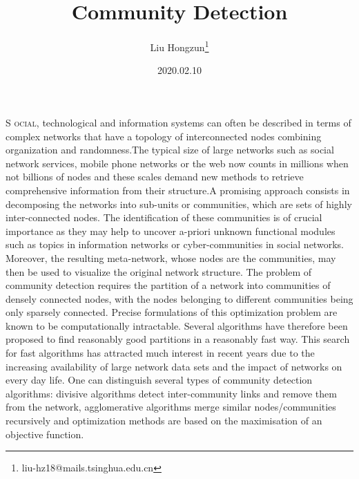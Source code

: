 \documentclass[UTF8, onecolumn, a4paper]{article}
\title{Community Detection}%
\author{Liu Hongzun\thanks{liu-hz18@mails.tsinghua.edu.cn}}
\affil{Department of Computer Science, Tsinghua University}
\date{2020.02.10}
\begin{document}
	\maketitle %
	\setlength{\columnsep}{25pt}%
	\columnseprule=0.7pt %
	\begin{multicols}{2}%
		\lettrine[lines=2]{S}{ ocial}, technological and information systems can often be described in terms of complex
		networks that have a topology of interconnected nodes combining organization and
		randomness.The typical size of large networks such as social network services, mobile phone networks or the web now counts in millions when not billions of nodes
		and these scales demand new methods to retrieve comprehensive information from their
		structure.A promising approach consists in decomposing the networks into sub-units
		or communities, which are sets of highly inter-connected nodes. The identification of
		these communities is of crucial importance as they may help to uncover a-priori unknown
		functional modules such as topics in information networks or cyber-communities in social
		networks. Moreover, the resulting meta-network, whose nodes are the communities, may
		then be used to visualize the original network structure.
		The problem of community detection requires the partition of a network into
		communities of densely connected nodes, with the nodes belonging to different
		communities being only sparsely connected. Precise formulations of this optimization
		problem are known to be computationally intractable. Several algorithms have therefore
		been proposed to find reasonably good partitions in a reasonably fast way. This search
		for fast algorithms has attracted much interest in recent years due to the increasing
		availability of large network data sets and the impact of networks on every day life. One
		can distinguish several types of community detection algorithms: divisive algorithms
		detect inter-community links and remove them from the network, agglomerative
		algorithms merge similar nodes/communities recursively and optimization methods
		are based on the maximisation of an objective function.
	\end{multicols}
\end{document}
